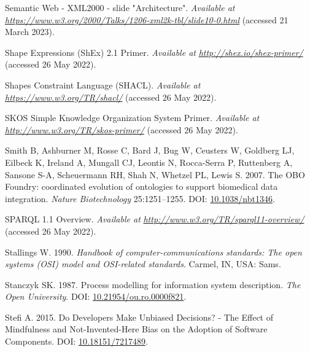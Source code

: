 \begin{CSLReferences}{1}{0}
\leavevmode{}%
Semantic Web - XML2000 - slide "Architecture". \emph{Available at} \href{https://www.w3.org/2000/Talks/1206-xml2k-tbl/slide10-0.html}{\emph{https://www.w3.org/2000/Talks/1206-xml2k-tbl/slide10-0.html}} (accessed 21 March 2023).

\leavevmode{}%
Shape Expressions (ShEx) 2.1 Primer. \emph{Available at} \href{http://shex.io/shex-primer/}{\emph{http://shex.io/shex-primer/}} (accessed 26 May 2022).

\leavevmode{}%
Shapes Constraint Language (SHACL). \emph{Available at} \href{https://www.w3.org/TR/shacl/}{\emph{https://www.w3.org/TR/shacl/}} (accessed 26 May 2022).

\leavevmode{}%
SKOS Simple Knowledge Organization System Primer. \emph{Available at} \href{http://www.w3.org/TR/skos-primer/}{\emph{http://www.w3.org/TR/skos-primer/}} (accessed 26 May 2022).

\leavevmode{}%
Smith B, Ashburner M, Rosse C, Bard J, Bug W, Ceusters W, Goldberg LJ, Eilbeck K, Ireland A, Mungall CJ, Leontis N, Rocca-Serra P, Ruttenberg A, Sansone S-A, Scheuermann RH, Shah N, Whetzel PL, Lewis S. 2007. The OBO Foundry: coordinated evolution of ontologies to support biomedical data integration. \emph{Nature Biotechnology} 25:1251--1255. DOI: \href{https://doi.org/10.1038/nbt1346}{10.1038/nbt1346}.

\leavevmode{}%
SPARQL 1.1 Overview. \emph{Available at} \href{http://www.w3.org/TR/sparql11-overview/}{\emph{http://www.w3.org/TR/sparql11-overview/}} (accessed 26 May 2022).

\leavevmode{}%
Stallings W. 1990. \emph{Handbook of computer-communications standards: The open systems (OSI) model and OSI-related standards}. Carmel, IN, USA: Sams.

\leavevmode{}%
Stanczyk SK. 1987. Process modelling for information system description. \emph{The Open University}. DOI: \href{https://doi.org/10.21954/ou.ro.0000f821}{10.21954/ou.ro.0000f821}.

\leavevmode{}%
Stefi A. 2015. Do Developers Make Unbiased Decisions? - The Effect of Mindfulness and Not-Invented-Here Bias on the Adoption of Software Components. DOI: \href{https://doi.org/10.18151/7217489}{10.18151/7217489}.


\end{CSLReferences}
